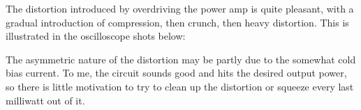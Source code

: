 \documentclass[pdftex,letterpaper,11pt]{article}
\begin{document}
\vspace{5mm}

The distortion introduced by overdriving the power amp is quite pleasant, with a gradual introduction of compression, then crunch, then heavy distortion. This is illustrated in the oscilloscope shots below:

\vspace{5mm}

\begin{figure}[H]
    \centering
    \qquad
    
    \qquad
\end{figure}

The asymmetric nature of the distortion may be partly due to the somewhat cold bias current. To me, the circuit sounds good and hits the desired output power, so there is little motivation to try to clean up the distortion or squeeze every last milliwatt out of it.
\end{document}
